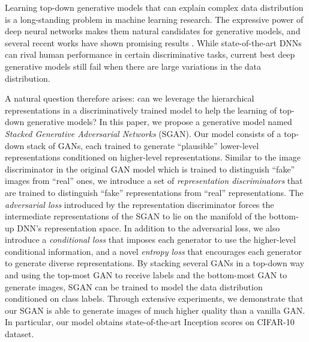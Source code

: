 \documentclass[10pt,twocolumn,letterpaper]{article}
\begin{document}
Learning top-down generative models that can explain complex data distribution is a long-standing problem in machine learning research. The expressive power of deep neural networks makes them natural candidates for generative models, and several recent works have shown promising results \cite{kingma2014auto, goodfellow2014generative, oord2016pixel, li2015generative, zhao2016energy,makhzani2016adversarial,dosovitskiy2015learning}. 
While state-of-the-art DNNs can rival human performance in certain discriminative tasks, current best deep generative models still fail when there are large variations in the data distribution. 

A natural question therefore arises: can we leverage
the hierarchical representations in a 
discriminatively trained model to help the learning of top-down generative models? In this paper, we propose a generative model named {\em Stacked Generative Adversarial Networks} (SGAN). %
Our model consists of a top-down stack of GANs, each trained to generate ``plausible'' lower-level representations conditioned on higher-level representations. Similar to the image discriminator in the original GAN model which is trained to distinguish ``fake'' images from ``real'' ones, we introduce a set of \emph{representation discriminators} that are trained to distinguish ``fake'' representations from ``real'' representations. The \emph{adversarial loss} introduced by the representation discriminator forces the intermediate representations of the SGAN to lie on the manifold of the bottom-up DNN's representation space. %
In addition to the adversarial loss, we also introduce a \emph{conditional loss} that imposes each generator to use the higher-level conditional information, and a novel \emph{entropy loss} that  encourages each generator to generate diverse representations. 
By stacking several GANs in a top-down way and using the top-most GAN to receive labels and the bottom-most GAN to generate images, SGAN can be trained to model the data distribution conditioned on class labels. 
Through extensive experiments, we demonstrate that our SGAN is able to generate images of much higher quality than a vanilla GAN. In particular, our model obtains state-of-the-art Inception scores on CIFAR-10 dataset.
\end{document}
